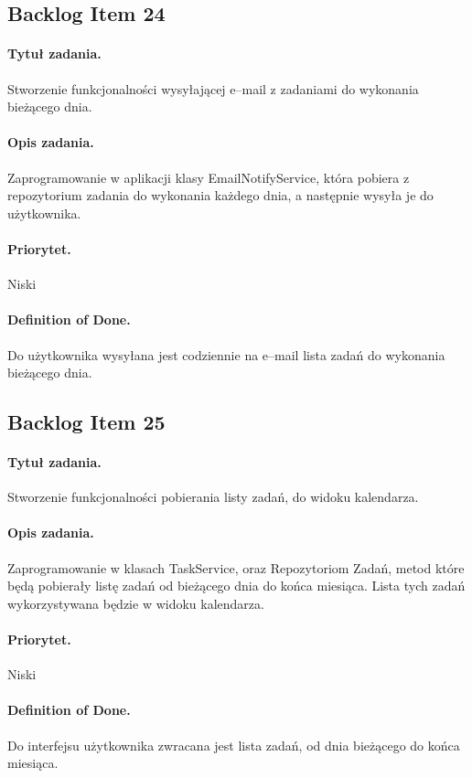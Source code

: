 ﻿\documentclass[a4paper]{article}
\begin{document}
\subsection{Backlog Item 24} 
\paragraph{Tytuł zadania.} Stworzenie funkcjonalności wysyłającej e--mail z zadaniami do wykonania bieżącego dnia.
\paragraph{Opis zadania.} Zaprogramowanie w aplikacji klasy EmailNotifyService, która pobiera z repozytorium zadania do wykonania każdego dnia, a następnie wysyła je do użytkownika.
\paragraph{Priorytet.} Niski
\paragraph{Definition of Done.} Do użytkownika wysyłana jest codziennie na e--mail lista zadań do wykonania bieżącego dnia.


\subsection{Backlog Item 25} 
\paragraph{Tytuł zadania.}  Stworzenie funkcjonalności pobierania listy zadań, do widoku kalendarza.
\paragraph{Opis zadania.} Zaprogramowanie w klasach TaskService, oraz Repozytoriom Zadań, metod które będą pobierały listę zadań od bieżącego dnia do końca miesiąca. Lista tych zadań wykorzystywana będzie w widoku kalendarza.
\paragraph{Priorytet.} Niski
\paragraph{Definition of Done.} Do interfejsu użytkownika zwracana jest lista zadań, od dnia bieżącego do końca miesiąca. 
\end{document}
